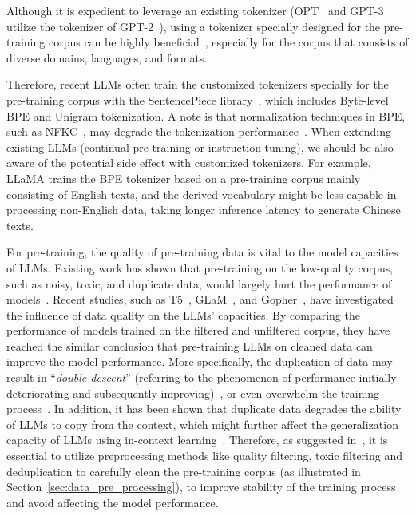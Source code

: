 Although it is expedient to leverage an existing tokenizer (\eg OPT~\cite{Zhang-arxiv-2022-OPT} and GPT-3~\cite{Brown-NeurIPS-2020-Language} utilize the tokenizer of GPT-2~\cite{radford-blog-2019-language}), using a  tokenizer specially designed for the pre-training corpus can be highly beneficial~\cite{Scao-arxiv-2022-BLOOM}, especially for the corpus that consists of diverse domains, languages, and {formats}. 
{Therefore, recent LLMs often train the customized tokenizers specially for the  pre-training corpus with the SentencePiece library~\cite{Kudo-EMNLP-2018-SentencePiece}, which includes Byte-level BPE and Unigram tokenization. 
{A note is that normalization techniques in BPE, such as NFKC~\cite{Davis-arxiv-2001-Unicode}, may  degrade the tokenization performance~\cite{Hoffmann-arxiv-2022-Training,Rae-arxiv-2021-Scaling,Scao-arxiv-2022-BLOOM}. } 
When extending existing LLMs  (\ie continual pre-training or instruction tuning), we should be also aware of the potential side effect with customized tokenizers.   
For example, LLaMA trains  
the BPE tokenizer  based on a pre-training corpus mainly consisting of English texts, and the derived vocabulary might be less capable in processing non-English data, \eg taking longer inference latency to generate Chinese texts. 

{For pre-training, the quality of pre-training data is vital to the  model capacities of LLMs. %
Existing work has shown that pre-training on the low-quality corpus, such as noisy, toxic, and duplicate data, would largely hurt the performance of models~\cite{Rae-arxiv-2021-Scaling, Lee-ACL-2022-Deduplicating, Kandpal-ICML-2022-Deduplicating, Hernandez-arxiv-2022-Scaling}.
Recent studies, such as T5~\cite{Raffel-JMLR-2020-Exploring}, GLaM~\cite{Du-ICML-2022-GLaM}, and Gopher~\cite{Rae-arxiv-2021-Scaling}, have investigated the influence of data quality on the LLMs' capacities.
By comparing the performance of models trained on the filtered and unfiltered corpus, they have reached the similar conclusion that pre-training LLMs on cleaned data can improve the model performance.  %
More specifically, the duplication of data may result in ``\emph{double descent}'' (referring to the phenomenon of performance initially deteriorating and subsequently improving)~\cite{Hernandez-arxiv-2022-Scaling,Nakkiran-ICLR-2020-Deep}, or even overwhelm the training process~\cite{Hernandez-arxiv-2022-Scaling}. 
In addition, it has been shown that duplicate data degrades the ability of LLMs to copy from the context, which might further affect the generalization capacity of LLMs using in-context learning~\cite{Hernandez-arxiv-2022-Scaling}.
Therefore, as suggested in~\cite{Rae-arxiv-2021-Scaling, Scao-arxiv-2022-BLOOM, Chowdhery-arxiv-2022-PaLM, Longpre-arxiv-2023-pretrainer}, {it is essential to utilize  preprocessing methods like quality filtering, toxic filtering and deduplication to carefully clean  the pre-training corpus  (as illustrated in Section~\ref{sec:data_pre_processing}), } to improve stability of the training process and avoid affecting the model performance.
}


}
